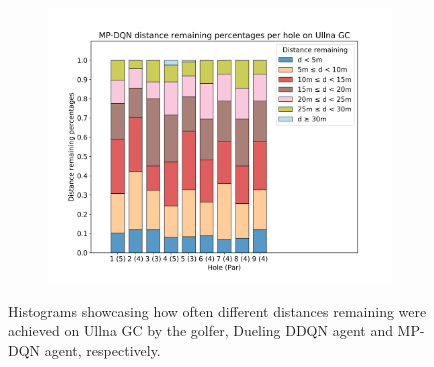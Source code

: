 \documentclass{kththesis}
\begin{document}
\begin{figure}
\begin{subfigure}{\textwidth}
    \centering
    \includegraphics[height=0.3\textheight]{AgentPercentages/MPDQN_Distance_Percentages_Ullna.png} 
    \end{subfigure}
    \caption{Histograms showcasing how often different distances remaining were achieved on Ullna GC by the golfer, Dueling DDQN agent and MP-DQN agent, respectively.}
    \label{fig:ullna_distance_histograms}
\end{figure}
\end{document}
